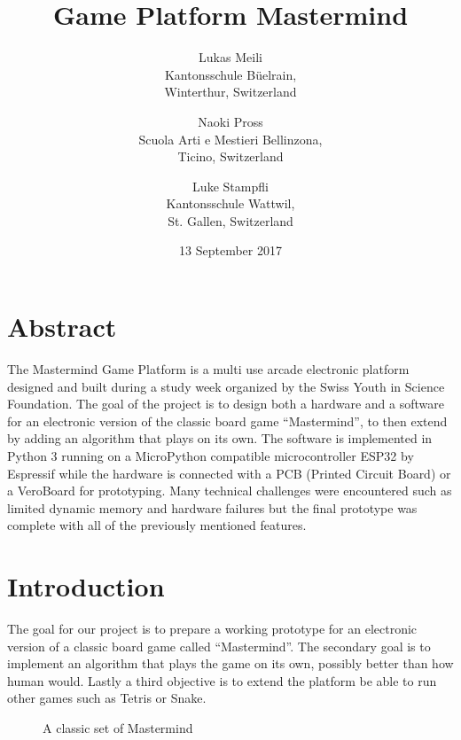 \documentclass[a4paper, 11pt]{article}
\title{Game Platform Mastermind}
\author{%
    Lukas Meili \\
    Kantonsschule Büelrain, \\
    Winterthur, Switzerland
    \and
    Naoki Pross \\
    Scuola Arti e Mestieri Bellinzona, \\
    Ticino, Switzerland
    \and
    Luke Stampfli \\
    Kantonsschule Wattwil, \\
    St. Gallen, Switzerland
}
\date{13 September 2017}
\begin{document}
\maketitle

\section*{Abstract}
The Mastermind Game Platform is a multi use arcade electronic platform
designed and built during a study week organized by  the Swiss Youth in
Science Foundation. The goal of the project is to design both a hardware
and a software for an electronic version of the classic board game
“Mastermind”, to then extend by adding an algorithm that plays on its
own. The software is implemented in Python 3 running on a MicroPython
compatible microcontroller ESP32 by Espressif while the hardware is
connected with a PCB (Printed Circuit Board) or a VeroBoard for prototyping.
Many technical challenges were encountered such as limited dynamic
memory and hardware failures but the final prototype was complete with
all of  the previously mentioned features.

\section{Introduction}
The goal for our project is to prepare a working prototype for an
electronic version of a classic board game called “Mastermind”. The
secondary goal is to implement an algorithm that plays the game on its
own, possibly better than how human would. Lastly a third objective is
to extend the platform be able to run other games such as Tetris or
Snake.

\begingroup
\setlength\intextsep{0pt}
\begin{figure}
    \caption{A classic set of Mastermind \cite{classicmastermind}} 
    \label{fig:mset}
    \vspace{-1cm}
\end{figure}
\end{document}

